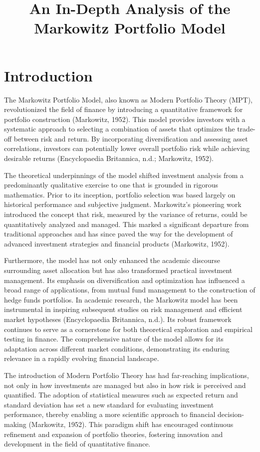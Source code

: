 \documentclass[11pt]{article}
\begin{document}
\title{An In-Depth Analysis of the Markowitz Portfolio Model}
\author{}
\date{}
\maketitle

\section{Introduction}
The Markowitz Portfolio Model, also known as Modern Portfolio Theory (MPT), revolutionized the field of finance by introducing a quantitative framework for portfolio construction (Markowitz, 1952). This model provides investors with a systematic approach to selecting a combination of assets that optimizes the trade-off between risk and return. By incorporating diversification and assessing asset correlations, investors can potentially lower overall portfolio risk while achieving desirable returns (Encyclopaedia Britannica, n.d.; Markowitz, 1952). 

The theoretical underpinnings of the model shifted investment analysis from a predominantly qualitative exercise to one that is grounded in rigorous mathematics. Prior to its inception, portfolio selection was based largely on historical performance and subjective judgment. Markowitz's pioneering work introduced the concept that risk, measured by the variance of returns, could be quantitatively analyzed and managed. This marked a significant departure from traditional approaches and has since paved the way for the development of advanced investment strategies and financial products (Markowitz, 1952).

Furthermore, the model has not only enhanced the academic discourse surrounding asset allocation but has also transformed practical investment management. Its emphasis on diversification and optimization has influenced a broad range of applications, from mutual fund management to the construction of hedge funds portfolios. In academic research, the Markowitz model has been instrumental in inspiring subsequent studies on risk management and efficient market hypotheses (Encyclopaedia Britannica, n.d.). Its robust framework continues to serve as a cornerstone for both theoretical exploration and empirical testing in finance. The comprehensive nature of the model allows for its adaptation across different market conditions, demonstrating its enduring relevance in a rapidly evolving financial landscape.

The introduction of Modern Portfolio Theory has had far-reaching implications, not only in how investments are managed but also in how risk is perceived and quantified. The adoption of statistical measures such as expected return and standard deviation has set a new standard for evaluating investment performance, thereby enabling a more scientific approach to financial decision-making (Markowitz, 1952). This paradigm shift has encouraged continuous refinement and expansion of portfolio theories, fostering innovation and development in the field of quantitative finance.
\end{document}
